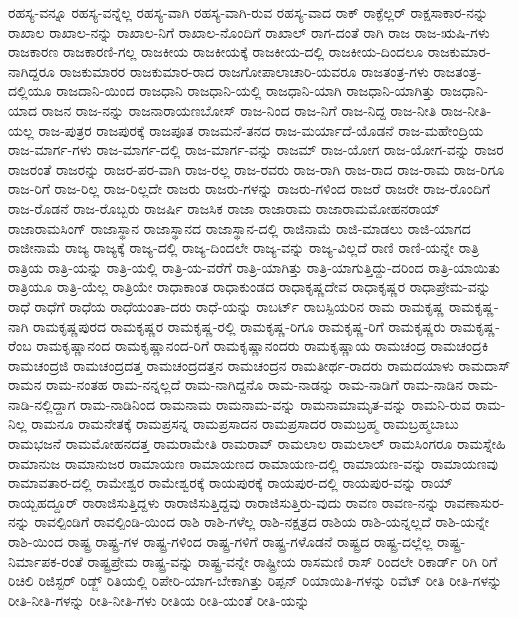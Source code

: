 {ರಹಸ್ಯ-ವನ್ನೂ
ರಹಸ್ಯ-ವನ್ನೆಲ್ಲ
ರಹಸ್ಯ-ವಾಗಿ
ರಹಸ್ಯ-ವಾಗಿ-ರುವ
ರಹಸ್ಯ-ವಾದ
ರಾಕ್
ರಾಕ್ಫೆಲ್ಲರ್
ರಾಕ್ಷಸಾಕಾರ-ನನ್ನು
ರಾಖಾಲ
ರಾಖಾಲ-ನನ್ನು
ರಾಖಾಲ-ನಿಗೆ
ರಾಖಾಲ-ನೊಂದಿಗೆ
ರಾಖಾಲ್
ರಾಗ-ದಂತೆ
ರಾಗಿ
ರಾಜ
ರಾಜ-ಋಷಿ-ಗಳು
ರಾಜಕಾರಣ
ರಾಜಕಾರಣಿ-ಗಲ್ಲ
ರಾಜಕೀಯ
ರಾಜಕೀಯಕ್ಕೆ
ರಾಜಕೀಯ-ದಲ್ಲಿ
ರಾಜಕೀಯ-ದಿಂದಲೂ
ರಾಜಕುಮಾರ-ನಾಗಿದ್ದರೂ
ರಾಜಕುಮಾರರ
ರಾಜಕುಮಾರ-ರಾದ
ರಾಜಗೋಪಾಲಾಚಾರಿ-ಯವರೂ
ರಾಜತಂತ್ರ-ಗಳು
ರಾಜತಂತ್ರ-ದಲ್ಲಿಯೂ
ರಾಜದಾನಿ-ಯಿಂದ
ರಾಜಧಾನಿ
ರಾಜಧಾನಿ-ಯಲ್ಲಿ
ರಾಜಧಾನಿ-ಯಾಗಿ
ರಾಜಧಾನಿ-ಯಾಗಿತ್ತು
ರಾಜಧಾನಿ-ಯಾದ
ರಾಜನ
ರಾಜ-ನನ್ನು
ರಾಜನಾರಾಯಣಬೋಸ್
ರಾಜ-ನಿಂದ
ರಾಜ-ನಿಗೆ
ರಾಜ-ನಿದ್ದ
ರಾಜ-ನೀತಿ
ರಾಜ-ನೀತಿ-ಯಲ್ಲ
ರಾಜ-ಪುತ್ರರ
ರಾಜಪುರಕ್ಕೆ
ರಾಜಪೂತ
ರಾಜಮನೆ-ತನದ
ರಾಜ-ಮರ್ಯಾದೆ-ಯೊಡನೆ
ರಾಜ-ಮಹೇಂದ್ರಿಯ
ರಾಜ-ಮಾರ್ಗ-ಗಳು
ರಾಜ-ಮಾರ್ಗ-ದಲ್ಲಿ
ರಾಜ-ಮಾರ್ಗ-ವನ್ನು
ರಾಜಮ್
ರಾಜ-ಯೋಗ
ರಾಜ-ಯೋಗ-ವನ್ನು
ರಾಜರ
ರಾಜರಂತೆ
ರಾಜರನ್ನು
ರಾಜರ-ಪರ-ವಾಗಿ
ರಾಜ-ರಲ್ಲ
ರಾಜ-ರವರು
ರಾಜ-ರಾಗಿ
ರಾಜ-ರಾದ
ರಾಜ-ರಾಮ
ರಾಜ-ರಿಗೂ
ರಾಜ-ರಿಗೆ
ರಾಜ-ರಿಲ್ಲ
ರಾಜ-ರಿಲ್ಲದೇ
ರಾಜರು
ರಾಜರು-ಗಳನ್ನು
ರಾಜರು-ಗಳಿಂದ
ರಾಜರೆ
ರಾಜರೇ
ರಾಜ-ರೊಂದಿಗೆ
ರಾಜ-ರೊಡನೆ
ರಾಜ-ರೊಬ್ಬರು
ರಾಜರ್ಷಿ
ರಾಜಸಿಕ
ರಾಜಾ
ರಾಜಾರಾಮ
ರಾಜಾರಾಮಮೋಹನರಾಯ್
ರಾಜಾರಾಮಸಿಂಗ್
ರಾಜಾಸ್ಥಾನ
ರಾಜಾಸ್ಥಾನದ
ರಾಜಾಸ್ಥಾನ-ದಲ್ಲಿ
ರಾಜಿನಾಮೆ
ರಾಜಿ-ಮಾಡಲು
ರಾಜಿ-ಯಾಗದ
ರಾಜೀನಾಮೆ
ರಾಜ್ಯ
ರಾಜ್ಯಕ್ಕೆ
ರಾಜ್ಯ-ದಲ್ಲಿ
ರಾಜ್ಯ-ದಿಂದಲೇ
ರಾಜ್ಯ-ವನ್ನು
ರಾಜ್ಯ-ವಿಲ್ಲದೆ
ರಾಣಿ
ರಾಣಿ-ಯನ್ನೇ
ರಾತ್ರಿ
ರಾತ್ರಿಯ
ರಾತ್ರಿ-ಯನ್ನು
ರಾತ್ರಿ-ಯಲ್ಲಿ
ರಾತ್ರಿ-ಯ-ವರೆಗೆ
ರಾತ್ರಿ-ಯಾಗಿತ್ತು
ರಾತ್ರಿ-ಯಾಗುತ್ತಿದ್ದು-ದರಿಂದ
ರಾತ್ರಿ-ಯಾಯಿತು
ರಾತ್ರಿಯೂ
ರಾತ್ರಿ-ಯೆಲ್ಲ
ರಾತ್ರಿಯೇ
ರಾಧಾಕಾಂತ
ರಾಧಾಕುಂಡದ
ರಾಧಾಕೃಷ್ಣದೇವ
ರಾಧಾಕೃಷ್ಣರ
ರಾಧಾಪ್ರೇಮ-ವನ್ನು
ರಾಧೆ
ರಾಧೆಗೆ
ರಾಧೆಯ
ರಾಧೆಯಂತಾ-ದರು
ರಾಧೆ-ಯನ್ನು
ರಾಬರ್ಟ್
ರಾಬಸ್ಪಿಯರಿನ
ರಾಮ
ರಾಮಕೃಷ್ಣ
ರಾಮಕೃಷ್ಣ-ನಾಗಿ
ರಾಮಕೃಷ್ಣಪುರದ
ರಾಮಕೃಷ್ಣರ
ರಾಮಕೃಷ್ಣ-ರಲ್ಲಿ
ರಾಮಕೃಷ್ಣ-ರಿಗೂ
ರಾಮಕೃಷ್ಣ-ರಿಗೆ
ರಾಮಕೃಷ್ಣರು
ರಾಮಕೃಷ್ಣ-ರೆಂಬ
ರಾಮಕೃಷ್ಣಾನಂದ
ರಾಮಕೃಷ್ಣಾನಂದ-ರಿಗೆ
ರಾಮಕೃಷ್ಣಾನಂದರು
ರಾಮಕೃಷ್ಣಾಯ
ರಾಮಚಂದ್ರ
ರಾಮಚಂದ್ರಕಿ
ರಾಮಚಂದ್ರಜಿ
ರಾಮಚಂದ್ರದತ್ತ
ರಾಮಚಂದ್ರದತ್ತನ
ರಾಮಚಂದ್ರನ
ರಾಮತೀರ್ಥ-ರಾದರು
ರಾಮದಯಾಳು
ರಾಮದಾಸ್
ರಾಮನ
ರಾಮ-ನಂತಹ
ರಾಮ-ನನ್ನಲ್ಲದೆ
ರಾಮ-ನಾಗಿದ್ದನೊ
ರಾಮ-ನಾಡನ್ನು
ರಾಮ-ನಾಡಿಗೆ
ರಾಮ-ನಾಡಿನ
ರಾಮ-ನಾಡಿ-ನಲ್ಲಿದ್ದಾಗ
ರಾಮ-ನಾಡಿನಿಂದ
ರಾಮನಾಮ
ರಾಮನಾಮ-ವನ್ನು
ರಾಮನಾಮಾಮೃತ-ವನ್ನು
ರಾಮನಿ-ರುವ
ರಾಮ-ನಿಲ್ಲ
ರಾಮನೂ
ರಾಮನೇತಕ್ಕೆ
ರಾಮಪ್ರಸನ್ನ
ರಾಮಪ್ರಸಾದನ
ರಾಮಪ್ರಸಾದರ
ರಾಮಬ್ರಹ್ಮ
ರಾಮಬ್ರಹ್ಮಬಾಬು
ರಾಮಭಜನೆ
ರಾಮಮೋಹನದತ್ತ
ರಾಮರಾಮೇತಿ
ರಾಮರಾವ್
ರಾಮಲಾಲ
ರಾಮಲಾಲ್
ರಾಮಸಿಂಗರೂ
ರಾಮಸ್ನೇಹಿ
ರಾಮಾನುಜ
ರಾಮಾನುಜರ
ರಾಮಾಯಣ
ರಾಮಾಯಣದ
ರಾಮಾಯಣ-ದಲ್ಲಿ
ರಾಮಾಯಣ-ವನ್ನು
ರಾಮಾಯಣವು
ರಾಮಾವತಾರ-ದಲ್ಲಿ
ರಾಮೇಶ್ವರ
ರಾಮೇಶ್ವರಕ್ಕೆ
ರಾಯಪುರಕ್ಕೆ
ರಾಯಪುರ-ದಲ್ಲಿ
ರಾಯಪುರ-ವನ್ನು
ರಾಯ್
ರಾಯ್ಬಹದ್ದೂರ್
ರಾರಾಜಿಸುತ್ತಿದ್ದಳು
ರಾರಾಜಿಸುತ್ತಿದ್ದವು
ರಾರಾಜಿಸುತ್ತಿರು-ವುದು
ರಾವಣ
ರಾವಣ-ನನ್ನು
ರಾವಣಾಸುರ-ನನ್ನು
ರಾವಲ್ಪಿಂಡಿಗೆ
ರಾವಲ್ಪಿಂಡಿ-ಯಿಂದ
ರಾಶಿ
ರಾಶಿ-ಗಳೆಲ್ಲ
ರಾಶಿ-ನಕ್ಷತ್ರದ
ರಾಶಿಯ
ರಾಶಿ-ಯನ್ನಲ್ಲದೆ
ರಾಶಿ-ಯನ್ನೇ
ರಾಶಿ-ಯಿಂದ
ರಾಷ್ಟ್ರ
ರಾಷ್ಟ್ರ-ಗಳ
ರಾಷ್ಟ್ರ-ಗಳಿಂದ
ರಾಷ್ಟ್ರ-ಗಳಿಗೆ
ರಾಷ್ಟ್ರ-ಗಳೊಡನೆ
ರಾಷ್ಟ್ರದ
ರಾಷ್ಟ್ರ-ದಲ್ಲೆಲ್ಲ
ರಾಷ್ಟ್ರ-ನಿರ್ಮಾಪಕ-ರಂತೆ
ರಾಷ್ಟ್ರಪ್ರೇಮ
ರಾಷ್ಟ್ರ-ವನ್ನು
ರಾಷ್ಟ್ರ-ವನ್ನೇ
ರಾಷ್ಟ್ರೀಯ
ರಾಸಮಣಿ
ರಾಸ್
ರಿಂದಲೇ
ರಿಕಾರ್ಡ್
ರಿಗಿ
ರಿಗೆ
ರಿಚಿಲಿ
ರಿಜಿಸ್ಟರ್
ರಿಡ್ಜ್
ರಿತಿಯಲ್ಲಿ
ರಿಪೇರಿ-ಯಾಗ-ಬೇಕಾಗಿತ್ತು
ರಿಪ್ಪನ್
ರಿಯಾಯಿತಿ-ಗಳನ್ನು
ರಿವೆಟ್
ರೀತಿ
ರೀತಿ-ಗಳನ್ನು
ರೀತಿ-ನೀತಿ-ಗಳನ್ನು
ರೀತಿ-ನೀತಿ-ಗಳು
ರೀತಿಯ
ರೀತಿ-ಯಂತೆ
ರೀತಿ-ಯನ್ನು
}
